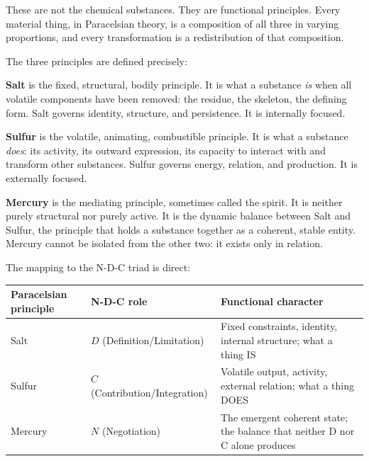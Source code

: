 \documentclass[
  11pt,
  letterpaper,
]{article}
\begin{document}
These are not the chemical substances. They are functional principles.
Every material thing, in Paracelsian theory, is a composition of all
three in varying proportions, and every transformation is a
redistribution of that composition.

The three principles are defined precisely:

\textbf{Salt} is the fixed, structural, bodily principle. It is what a
substance \emph{is} when all volatile components have been removed: the
residue, the skeleton, the defining form. Salt governs identity,
structure, and persistence. It is internally focused.

\textbf{Sulfur} is the volatile, animating, combustible principle. It is
what a substance \emph{does}: its activity, its outward expression, its
capacity to interact with and transform other substances. Sulfur governs
energy, relation, and production. It is externally focused.

\textbf{Mercury} is the mediating principle, sometimes called the
spirit. It is neither purely structural nor purely active. It is the
dynamic balance between Salt and Sulfur, the principle that holds a
substance together as a coherent, stable entity. Mercury cannot be
isolated from the other two: it exists only in relation.

The mapping to the N-D-C triad is direct:

\begin{longtable}[]{@{}
  >{\raggedright\arraybackslash}p{}
  >{\raggedright\arraybackslash}p{}
  >{\raggedright\arraybackslash}p{}@{}}
\toprule\noalign{}
\begin{minipage}[b]{\linewidth}\raggedright
Paracelsian principle
\end{minipage} & \begin{minipage}[b]{\linewidth}\raggedright
N-D-C role
\end{minipage} & \begin{minipage}[b]{\linewidth}\raggedright
Functional character
\end{minipage} \\
\midrule\noalign{}
\endhead
\bottomrule\noalign{}
\endlastfoot
Salt & \(D\) (Definition/Limitation) & Fixed constraints, identity,
internal structure; what a thing IS \\
Sulfur & \(C\) (Contribution/Integration) & Volatile output, activity,
external relation; what a thing DOES \\
Mercury & \(N\) (Negotiation) & The emergent coherent state; the balance
that neither D nor C alone produces \\
\end{longtable}
\end{document}
